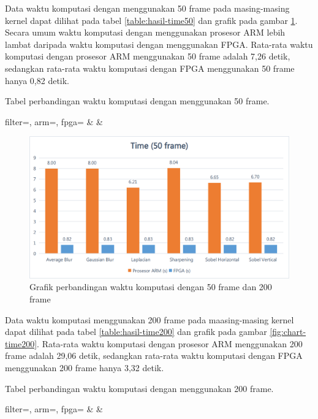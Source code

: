 Data waktu komputasi dengan menggunakan 50 frame pada masing-masing kernel dapat dilihat pada tabel \ref{table:hasil-time50} dan grafik pada gambar \ref{fig:chart-time50}. Secara umum waktu komputasi dengan menggunakan prosesor ARM lebih lambat daripada waktu komputasi dengan menggunakan FPGA. Rata-rata waktu komputasi dengan prosesor ARM menggunakan 50 frame adalah 7,26 detik, sedangkan rata-rata waktu komputasi dengan FPGA menggunakan 50 frame hanya 0,82 detik.
\begin{atable}
    \caption{Tabel perbandingan waktu komputasi dengan menggunakan 50 frame.}
    \label{table:hasil-time50}
        {
            filter=\filter, 
            arm=\arm, 
            fpga=\fpga}
        {
            \filter & 
            \arm & 
            \fpga }
\end{atable}
\begin{figure}[ht]
    \centering
    \includegraphics[width=0.81\linewidth, center]{images/chart/chart-time50.png}
    \caption{Grafik perbandingan waktu komputasi dengan 50 frame dan 200 frame}
    \label{fig:chart-time50}
\end{figure}


Data waktu komputasi menggunakan 200 frame pada maasing-masing kernel dapat dilihat pada tabel \ref{table:hasil-time200} dan grafik pada gambar \ref{fig:chart-time200}. Rata-rata waktu komputasi dengan prosesor ARM menggunakan 200 frame adalah 29,06 detik, sedangkan rata-rata waktu komputasi dengan FPGA menggunakan 200 frame hanya 3,32 detik.
\begin{atable}
    \caption{Tabel perbandingan waktu komputasi dengan menggunakan 200 frame.}
    \label{table:hasil-time200}
        {
            filter=\filter, 
            arm=\arm, 
            fpga=\fpga}
        {
            \filter & 
            \arm & 
            \fpga }
\end{atable}

